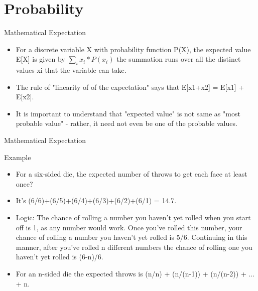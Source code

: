 \documentclass{beamer}
\begin{document}
\section{Probability}
\begin{frame}[<+->]{Mathematical Expectation}
  \begin{block}{}
    \begin{itemize}
      \item For a discrete variable X with probability function P(X), the expected value E[X] is given by $\sum_i x_i*P(x_i)$ the summation runs over all the distinct values xi that the variable can take.
      \item The rule of "linearity of of the expectation" says that E[x1+x2] = E[x1] + E[x2].
      \item It is important to understand that "expected value" is not same as "most probable value" - rather, it need not even be one of the probable values.
    \end{itemize}
\end{block}
\end{frame}

\begin{frame}[<+->]{Mathematical Expectation}
  \begin{block}{Example}
    \begin{itemize}
      \item For a six-sided die, the expected number of throws to get each face at least once?
	  \item It's (6/6)+(6/5)+(6/4)+(6/3)+(6/2)+(6/1) = 14.7.
      \item Logic: The chance of rolling a number you haven't yet rolled when you start off is 1, as any number would work. Once you've rolled this number, your chance of rolling a number you haven't yet rolled is 5/6. Continuing in this manner, after you've rolled n different numbers the chance of rolling one you haven't yet rolled is (6-n)/6.
      \item For an n-sided die the expected throws is (n/n) + (n/(n-1)) + (n/(n-2)) + ... + n.
    \end{itemize}
\end{block}
\end{frame}
\end{document}
